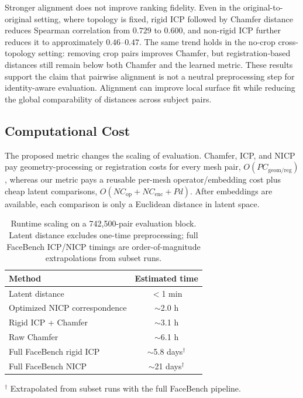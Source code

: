 \documentclass{article}
\begin{document}
Stronger alignment does not improve ranking fidelity. Even in the original-to-original setting, where topology is fixed, rigid ICP followed by Chamfer distance reduces Spearman correlation from $0.729$ to $0.600$, and non-rigid ICP further reduces it to approximately $0.46$--$0.47$. The same trend holds in the no-crop cross-topology setting: removing crop pairs improves Chamfer, but registration-based distances still remain below both Chamfer and the learned metric. These results support the claim that pairwise alignment is not a neutral preprocessing step for identity-aware evaluation. Alignment can improve local surface fit while reducing the global comparability of distances across subject pairs.

\subsection{Computational Cost}
\label{sec:computational_cost}

The proposed metric changes the scaling of evaluation. Chamfer, ICP, and NICP
pay geometry-processing or registration costs for every mesh pair,
$O(PC_{\mathrm{geom/reg}})$, whereas our metric pays a reusable per-mesh
operator/embedding cost plus cheap latent comparisons,
$O(NC_{\mathrm{op}}+NC_{\mathrm{enc}}+Pd)$. After embeddings are available,
each comparison is only a Euclidean distance in latent space.

\begin{table}[!ht]
\centering
\scriptsize
\caption{Runtime scaling on a 742,500-pair evaluation block. Latent distance
excludes one-time preprocessing; full FaceBench ICP/NICP timings are
order-of-magnitude extrapolations from subset runs.}
\label{tab:runtime_scaling}
\begin{tabular}{lc}
\toprule
Method & Estimated time \\
\midrule
Latent distance & $<$1 min \\
Optimized NICP correspondence & $\sim$2.0 h \\
Rigid ICP + Chamfer & $\sim$3.1 h \\
Raw Chamfer & $\sim$6.1 h \\
Full FaceBench rigid ICP & $\sim$5.8 days$^\dagger$ \\
Full FaceBench NICP & $\sim$21 days$^\dagger$ \\
\bottomrule
\end{tabular}

\vspace{0.3em}
\footnotesize{$^\dagger$ Extrapolated from subset runs with the full FaceBench pipeline.}
\end{table}
\end{document}
